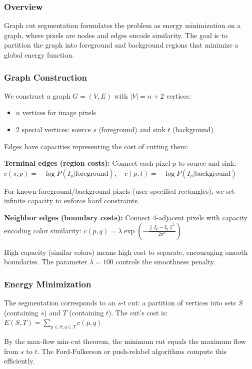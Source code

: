 \documentclass[11pt,a4paper]{article}
\begin{document}
\subsubsection{Overview}
Graph cut segmentation formulates the problem as energy minimization on a graph, where pixels are nodes and edges encode similarity. The goal is to partition the graph into foreground and background regions that minimize a global energy function.

\subsubsection{Graph Construction}
We construct a graph $G = (V, E)$ with $|V| = n + 2$ vertices:
\begin{itemize}
    \item $n$ vertices for image pixels
    \item 2 special vertices: source $s$ (foreground) and sink $t$ (background)
\end{itemize}

Edges have capacities representing the cost of cutting them:

\textbf{Terminal edges (region costs):}
Connect each pixel $p$ to source and sink:
$c(s, p) = -\log P(I_p | \text{foreground}), \quad c(p, t) = -\log P(I_p | \text{background})$

For known foreground/background pixels (user-specified rectangles), we set infinite capacity to enforce hard constraints.

\textbf{Neighbor edges (boundary costs):}
Connect 4-adjacent pixels with capacity encoding color similarity:
$c(p, q) = \lambda \exp\left(-\frac{\|I_p - I_q\|^2}{2\sigma^2}\right)$

High capacity (similar colors) means high cost to separate, encouraging smooth boundaries. The parameter $\lambda = 100$ controls the smoothness penalty.

\subsubsection{Energy Minimization}
The segmentation corresponds to an $s$-$t$ cut: a partition of vertices into sets $S$ (containing $s$) and $T$ (containing $t$). The cut's cost is:
$E(S, T) = \sum_{p \in S, q \in T} c(p, q)$

By the max-flow min-cut theorem, the minimum cut equals the maximum flow from $s$ to $t$. The Ford-Fulkerson or push-relabel algorithms compute this efficiently.
\end{document}
